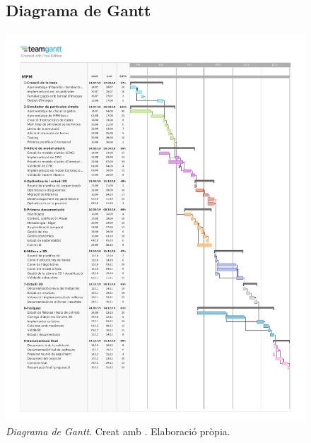 \documentclass[a4paper]{article} %
\begin{document}
	\begin{figure}[H]
	\subsection{Diagrama de Gantt}
		\includegraphics[width=1.45\textwidth,center]{images/Gantt.pdf}%
		\caption[\textit{Diagrama de Gantt}]{\textit{\small Diagrama de Gantt}. Creat amb \cite{Teamgantt2019}. Elaboració pròpia.}
		\label{fig:Gantt}
	\end{figure}
\end{document}

